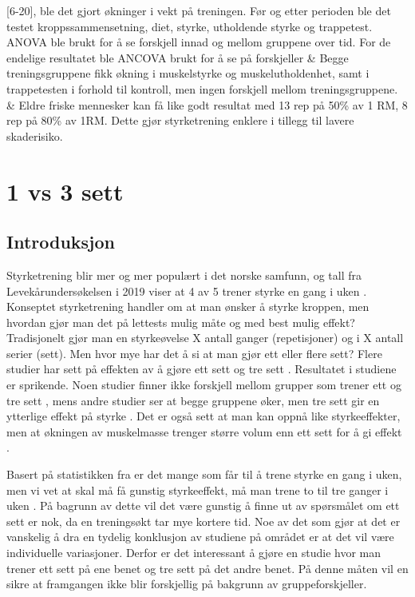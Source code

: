 \documentclass[
]{book}
\begin{document}
\begin{longtable}[]
{[}6-20{]}, ble det gjort økninger i vekt på treningen. Før og etter perioden ble
det testet kroppssammensetning, diet, styrke, utholdende styrke og
trappetest. ANOVA ble brukt for å se forskjell innad og mellom gruppene over
tid. For de endelige resultatet ble ANCOVA brukt for å se på forskjeller & Begge \textbar{}
treningsgruppene fikk økning i muskelstyrke og muskelutholdenhet, samt i
trappetesten i forhold til kontroll, men ingen forskjell mellom \textbar{}
treningsgruppene. & Eldre friske
mennesker kan få like godt resultat med 13 rep på 50\% av 1 RM, 8 rep på 80\%
av 1RM. Dette gjør styrketrening enklere i tillegg
til lavere skaderisiko. \\
\bottomrule
\end{longtable}

\hypertarget{vs-3-sett}{%
\chapter{1 vs 3 sett}\label{vs-3-sett}}

\hypertarget{introduksjon-2}{%
\section{Introduksjon}\label{introduksjon-2}}

Styrketrening blir mer og mer populært i det norske samfunn, og tall fra Levekårundersøkelsen i 2019 viser at 4 av 5 trener styrke en gang i uken \citep{statistisksentralbyrå2019}. Konseptet styrketrening handler om at man ønsker å styrke kroppen, men hvordan gjør man det på lettests mulig måte og med best mulig effekt? Tradisjonelt gjør man en styrkeøvelse X antall ganger (repetisjoner) og i X antall serier (sett). Men hvor mye har det å si at man gjør ett eller flere sett? Flere studier har sett på effekten av å gjøre ett sett og tre sett \citep{galvão2005, hass2000, krieger2009, radaelli2014, schoenfeld2019}. Resultatet i studiene er sprikende. Noen studier finner ikke forskjell mellom grupper som trener ett og tre sett \citetext{\citealp[ ]{hass2000}; \citealp{radaelli2014}}, mens andre studier ser at begge gruppene øker, men tre sett gir en ytterlige effekt på styrke \citep{krieger2009, galvão2005}. Det er også sett at man kan oppnå like styrkeeffekter, men at økningen av muskelmasse trenger større volum enn ett sett for å gi effekt \citep{schoenfeld2019}.

Basert på statistikken fra \citet{statistisksentralbyrå2019} er det mange som får til å trene styrke en gang i uken, men vi vet at skal må få gunstig styrkeeffekt, må man trene to til tre ganger i uken \citep{schoenfeld2016}. På bagrunn av dette vil det være gunstig å finne ut av spørsmålet om ett sett er nok, da en treningsøkt tar mye kortere tid. Noe av det som gjør at det er vanskelig å dra en tydelig konklusjon av studiene på området er at det vil være individuelle variasjoner. Derfor er det interessant å gjøre en studie hvor man trener ett sett på ene benet og tre sett på det andre benet. På denne måten vil en sikre at framgangen ikke blir forskjellig på bakgrunn av gruppeforskjeller.
\end{document}
